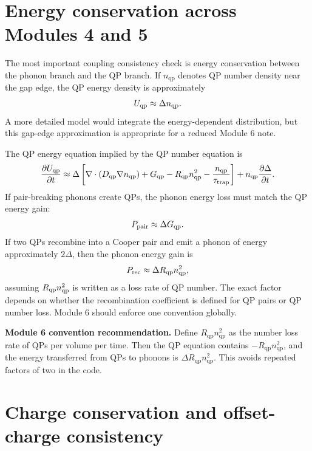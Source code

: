 \documentclass[11pt]{article}
\newcommand{\DeltaSC}{\Delta}
\newcommand{\nqp}{n_{\mathrm{qp}}}
\newcommand{\Dqp}{D_{\mathrm{qp}}}
\newcommand{\Gqp}{G_{\mathrm{qp}}}
\newcommand{\Rqp}{R_{\mathrm{qp}}}
\newcommand{\tautrap}{\tau_{\mathrm{trap}}}
\begin{document}
\section{Energy conservation across Modules 4 and 5}

The most important coupling consistency check is energy conservation between the phonon branch and the QP branch. If \(\nqp\) denotes QP number density near the gap edge, the QP energy density is approximately
\begin{equation}
U_{\qp}\approx \DeltaSC\nqp.
\end{equation}
A more detailed model would integrate the energy-dependent distribution, but this gap-edge approximation is appropriate for a reduced Module 6 note.

The QP energy equation implied by the QP number equation is
\begin{equation}
\pdv{U_{\qp}}{t}
\approx \DeltaSC\left[\nabla\cdot(\Dqp\nabla\nqp)+\Gqp-\Rqp\nqp^2-\frac{\nqp}{\tautrap}\right]
+\nqp\pdv{\DeltaSC}{t}.
\end{equation}
If pair-breaking phonons create QPs, the phonon energy loss must match the QP energy gain:
\begin{equation}
P_{\mathrm{pair}}\approx \DeltaSC G_{\qp}.
\end{equation}
If two QPs recombine into a Cooper pair and emit a phonon of energy approximately \(2\DeltaSC\), then the phonon energy gain is
\begin{equation}
P_{\mathrm{rec}}\approx \DeltaSC R_{\qp}\nqp^2,
\end{equation}
assuming \(R_{\qp}\nqp^2\) is written as a loss rate of QP number. The exact factor depends on whether the recombination coefficient is defined for QP pairs or QP number loss. Module 6 should enforce one convention globally.

\begin{physicsbox}
\textbf{Module 6 convention recommendation.} Define \(\Rqp\nqp^2\) as the number loss rate of QPs per volume per time. Then the QP equation contains \(-\Rqp\nqp^2\), and the energy transferred from QPs to phonons is \(\DeltaSC\Rqp\nqp^2\). This avoids repeated factors of two in the code.
\end{physicsbox}

\section{Charge conservation and offset-charge consistency}
\end{document}
